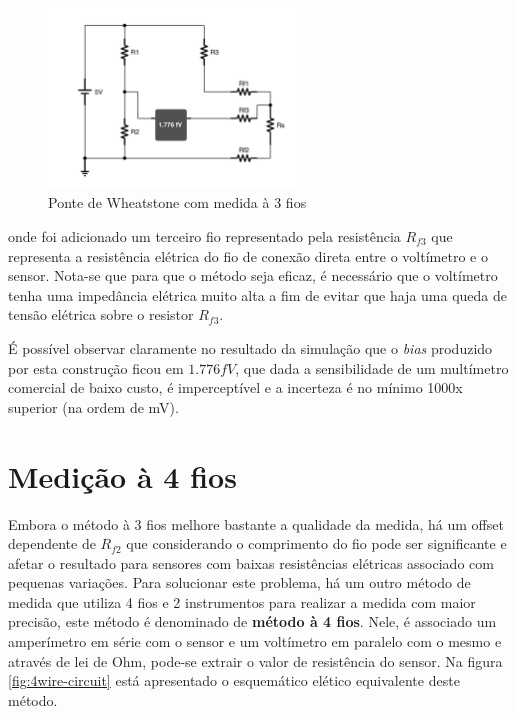 \documentclass[12pt,a4paper]{instrumentacao}
\begin{document}
\begin{figure}[H]
\centering
\includegraphics[width=0.6\textwidth]{Wheatstone-Bridge-3Wire.pdf}
\caption{Ponte de Wheatstone com medida à 3 fios}
\label{fig:wheatstone-3wire}
\end{figure}

onde foi adicionado um terceiro fio representado pela resistência $R_{f3}$ que representa a resistência elétrica do fio de conexão direta entre o voltímetro e o sensor. Nota-se que para que o método seja eficaz, é necessário que o voltímetro tenha uma impedância elétrica muito alta a fim de evitar que haja uma queda de tensão elétrica sobre o resistor $R_{f3}$.

É possível observar claramente no resultado da simulação que o \textit{bias} produzido por esta construção ficou em $1.776 fV$, que dada a sensibilidade de um multímetro comercial de baixo custo, é imperceptível e a incerteza é no mínimo 1000x superior (na ordem de mV).


\section{Medição à 4 fios}

Embora o método à 3 fios melhore bastante a qualidade da medida, há um offset dependente de $R_{f2}$ que considerando o comprimento do fio pode ser significante e afetar o resultado para sensores com baixas resistências elétricas associado com pequenas variações. Para solucionar este problema, há um outro método de medida que utiliza 4 fios e 2 instrumentos para realizar a medida com maior precisão, este método é denominado de \textbf{método à 4 fios}. Nele, é associado um amperímetro em série com o sensor e um voltímetro em paralelo com o mesmo e através de lei de Ohm, pode-se extrair o valor de resistência do sensor. Na figura \ref{fig:4wire-circuit} está apresentado o esquemático elético equivalente deste método.
\end{document}
